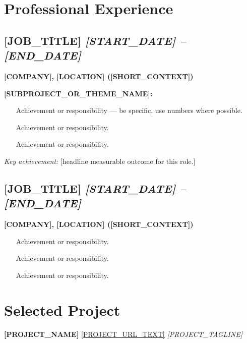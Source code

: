 \documentclass[10pt,a4paper]{article}
\begin{document}
\section*{Professional Experience}

\subsection*{\textbf{[JOB_TITLE]} \hfill \textit{[START_DATE] -- [END_DATE]}}
\noindent \textbf{[COMPANY], [LOCATION] ([SHORT_CONTEXT])}

\vspace{2pt}
\noindent \textbf{[SUBPROJECT_OR_THEME_NAME]:}
\begin{itemize}
\item [Achievement or responsibility — be specific, use numbers where possible.]
\item [Achievement or responsibility.]
\item [Achievement or responsibility.]
\end{itemize}
\noindent \textit{Key achievement:} [headline measurable outcome for this role.]

\vspace{6pt}
\subsection*{\textbf{[JOB_TITLE]} \hfill \textit{[START_DATE] -- [END_DATE]}}
\noindent \textbf{[COMPANY], [LOCATION] ([SHORT_CONTEXT])}
\begin{itemize}
\item [Achievement or responsibility.]
\item [Achievement or responsibility.]
\item [Achievement or responsibility.]
\end{itemize}


\section*{Selected Project}
\noindent \textbf{[PROJECT_NAME]} \href{[PROJECT_URL]}{\underline{[PROJECT_URL_TEXT]}} \hfill \textit{[PROJECT_TAGLINE]}
\end{document}
